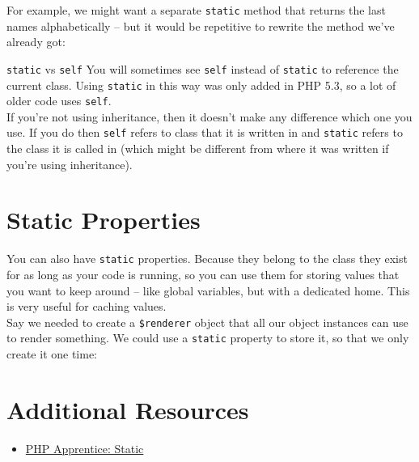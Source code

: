 For example, we might want a separate \texttt{static} method that returns the last names alphabetically – but it would be repetitive to rewrite the method we've already got:


\begin{infobox}{\texttt{static} vs \texttt{self}}
    You will sometimes see \texttt{self} instead of \texttt{static} to reference the current class. Using \texttt{static} in this way was only added in PHP 5.3, so a lot of older code uses \texttt{self}.
    \\

    If you're not using inheritance, then it doesn't make any difference which one you use. If you do then \texttt{self} refers to class that it is written in and \texttt{static} refers to the class it is called in (which might be different from where it was written if you're using inheritance).
\end{infobox}


\section{Static Properties}

You can also have \texttt{static} properties. Because they belong to the class they exist for as long as your code is running, so you can use them for storing values that you want to keep around – like global variables, but with a dedicated home. This is very useful for caching values.
\\

Say we needed to create a \texttt{\$renderer} object that all our object instances can use to render\textellipsis{} something. We could use a \texttt{static} property to store it, so that we only create it one time:



\section{Additional Resources}

\begin{itemize}[leftmargin=*]
    \item \href{https://phpapprentice.com/static.html}{PHP Apprentice: Static}
\end{itemize}
